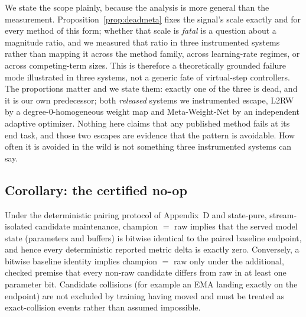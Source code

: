 We state the scope plainly, because the analysis is more general than the
measurement. Proposition~\ref{prop:deadmeta} fixes the signal's scale exactly
and for every method of this form; whether that scale is \emph{fatal} is a
question about a magnitude ratio, and we measured that ratio in three
instrumented systems rather than mapping it across the method family, across
learning-rate regimes, or across competing-term sizes. This is therefore a
theoretically grounded failure mode illustrated in three systems, not a generic
fate of virtual-step controllers. The proportions matter and we state them:
exactly one of the three is dead, and it is our own predecessor; both
\emph{released} systems we instrumented escape, L2RW by a
degree-0-homogeneous weight map and Meta-Weight-Net by an independent adaptive
optimizer. Nothing here claims that any published method fails at its end task,
and those two escapes are evidence that the pattern is avoidable. How often it
is avoided in the wild is not something three instrumented systems can say.

\subsection{Corollary: the certified no-op}

\begin{corollaryx}[Certified no-op]

Under the deterministic pairing protocol of Appendix~D and state-pure,
stream-isolated candidate maintenance, champion $=$ raw implies that the
served model state (parameters and buffers) is bitwise identical to the
paired baseline endpoint, and hence every deterministic reported metric
delta is exactly zero. Conversely, a bitwise baseline identity implies
champion $=$ raw only under the additional, checked premise that every
non-raw candidate differs from raw in at least one parameter bit. Candidate
collisions (for example an EMA landing exactly on the endpoint) are not
excluded by training having moved and must be treated as exact-collision
events rather than assumed impossible.
\end{corollaryx}

